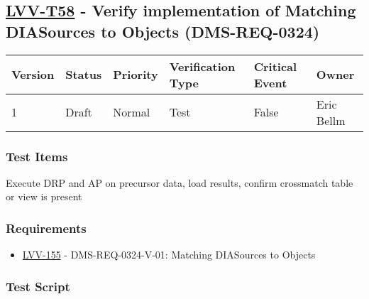 \hypertarget{lvv-t58---verify-implementation-of-matching-diasources-to-objects-dms-req-0324}{%
\subsection{\texorpdfstring{\href{https://jira.lsstcorp.org/secure/Tests.jspa\#/testCase/LVV-T58}{LVV-T58}
- Verify implementation of Matching DIASources to Objects
(DMS-REQ-0324)}{LVV-T58 - Verify implementation of Matching DIASources to Objects (DMS-REQ-0324)}}\label{lvv-t58---verify-implementation-of-matching-diasources-to-objects-dms-req-0324}}

\begin{longtable}[]{@{}llllll@{}}
\toprule
Version & Status & Priority & Verification Type & Critical Event &
Owner\tabularnewline
\midrule
\endhead
1 & Draft & Normal & Test & False & Eric Bellm\tabularnewline
\bottomrule
\end{longtable}

\hypertarget{test-items-34}{%
\subsubsection{Test Items}\label{test-items-34}}

Execute DRP and AP on precursor data, load results, confirm crossmatch
table or view is present

\hypertarget{requirements-35}{%
\subsubsection{Requirements}\label{requirements-35}}

\begin{itemize}
\tightlist
\item
  \href{https://jira.lsstcorp.org/browse/LVV-155}{LVV-155} -
  DMS-REQ-0324-V-01: Matching DIASources to Objects
\end{itemize}

\hypertarget{test-script-35}{%
\subsubsection{Test Script}\label{test-script-35}}

